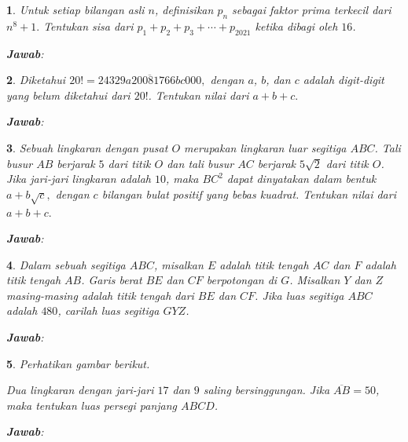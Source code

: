 \documentclass[11pt,a4paper,DIV=12]{scrartcl}
\newcommand\answerbox{%
\vspace*{0.5cm}%
\noindent\textbf{\textsf{Jawab}}: \fbox{\rule{14cm}{0pt}\rule[-0.2ex]{0pt}{1.9ex}}}
\theoremstyle{problemstyle}
\newtheorem{problem}{}
\theoremstyle{answerstyle}
\begin{document}
\begin{problem}
  Untuk setiap bilangan asli \(n\), definisikan \(p_n\) sebagai faktor prima terkecil dari
  $
    n^8+1.
  $
  Tentukan sisa dari
  $
    p_1+p_2+p_3+\cdots+p_{2021}
  $
  ketika dibagi oleh \(16\).

  \answerbox
\end{problem}

\begin{problem}
  Diketahui
  $
    20! = \overline{24329a20081766bc000},
  $
  dengan \(a\), \(b\), dan \(c\) adalah digit-digit yang belum diketahui dari \(20!\).
  Tentukan nilai dari
  $
    a+b+c.
  $


  \answerbox
\end{problem}

\begin{problem}
  Sebuah lingkaran dengan pusat \(O\) merupakan lingkaran luar segitiga \(ABC\).
  Tali busur \(AB\) berjarak \(5\) dari titik \(O\) dan tali busur \(AC\) berjarak \(5\sqrt{2}\) dari titik \(O\).
  Jika jari-jari lingkaran adalah \(10\), maka \(BC^2\) dapat dinyatakan dalam bentuk
  $
    a+b\sqrt{c},
  $
  dengan \(c\) bilangan bulat positif yang bebas kuadrat.
  Tentukan nilai dari
  $
    a+b+c.
  $

  \answerbox
\end{problem}

\begin{problem}
  Dalam sebuah segitiga \(ABC\), misalkan \(E\) adalah titik tengah \(AC\) dan \(F\) adalah titik tengah \(AB\).
  Garis berat \(BE\) dan \(CF\) berpotongan di \(G\).
  Misalkan \(Y\) dan \(Z\) masing-masing adalah titik tengah dari \(BE\) dan \(CF\).
  Jika luas segitiga \(ABC\) adalah \(480\), carilah luas segitiga \(GYZ\).

  \answerbox
\end{problem}

\begin{problem}
  Perhatikan gambar berikut.
  \begin{center}
  \end{center}
  Dua lingkaran dengan jari-jari \(17\) dan \(9\) saling bersinggungan.
  Jika \(\overline{AB}=50\), maka tentukan luas persegi panjang \(ABCD\).

  \answerbox
\end{problem}
\end{document}
